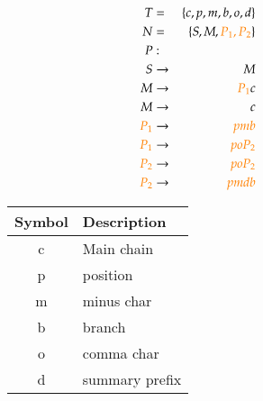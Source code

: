 \documentclass[a4paper,10pt]{article}
\newcommand{\captionVSpace}{\vspace*{-0.05cm}}
\newcommand{\CFGDefinitionSize}{0.60}
\newcommand{\SymbolDescriptionTable}{0.35}
\newcommand{\colorNew}{orange}
\begin{document}
\begin{figure}[H]
    \begin{minipage}[l]{\CFGDefinitionSize\textwidth}
        $$
        \begin{aligned}
            T &=& \{c, p, m, b, o, d\} \\
            N &=& \{S, M, {\color{\colorNew}P_1, P_2}\} \\
            P &:& \\
            S &\rightarrow& M \\
            M &\rightarrow& {\color{\colorNew}P_1}c \\
            M &\rightarrow& c \\
            {\color{\colorNew}P_1} &\rightarrow& {\color{\colorNew}pmb} \\
            {\color{\colorNew}P_1} &\rightarrow& {\color{\colorNew}poP_2} \\
            {\color{\colorNew}P_2} &\rightarrow& {\color{\colorNew}poP_2} \\
            {\color{\colorNew}P_2} &\rightarrow& {\color{\colorNew}pmdb} \\
        \end{aligned}
        $$
        \caption{Adjusted CFG with $P_1$ and $P_2$.}
        \label{fig:CFGWithMultipleBranchesAtTheSameLengthNewApproach}
    \end{minipage}
    \begin{minipage}[r]{\SymbolDescriptionTable\textwidth}
        \begin{table}[H]
        \centering
            \begin{tabular}{c|l}
                \toprule
                \textbf{Symbol} & \textbf{Description} \\
                \midrule
                c & Main chain \\
                p & position \\
                m & minus char \\
                b & branch \\
                o & comma char \\
                d & summary prefix \\
                \bottomrule
            \end{tabular}
        \end{table}
    \end{minipage}
\end{figure}
\end{document}
